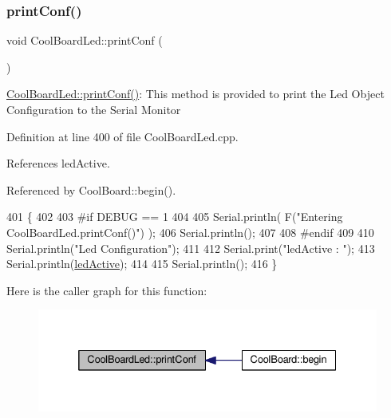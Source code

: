 \subsubsection{\texorpdfstring{print\+Conf()}{printConf()}}
{\footnotesize\ttfamily void Cool\+Board\+Led\+::print\+Conf (\begin{DoxyParamCaption}{ }\end{DoxyParamCaption})}

\hyperlink{classCoolBoardLed_a8ed3053a36f0ed4a131f43b5b17efb61}{Cool\+Board\+Led\+::print\+Conf()}\+: This method is provided to print the Led Object Configuration to the Serial Monitor 

Definition at line 400 of file Cool\+Board\+Led.\+cpp.



References led\+Active.



Referenced by Cool\+Board\+::begin().


\begin{DoxyCode}
401 \{
402 
403 \textcolor{preprocessor}{#if DEBUG == 1 }
404 
405     Serial.println( F(\textcolor{stringliteral}{"Entering CoolBoardLed.printConf()"}) );
406     Serial.println();
407 
408 \textcolor{preprocessor}{#endif}
409 
410     Serial.println(\textcolor{stringliteral}{"Led Configuration"});
411 
412     Serial.print(\textcolor{stringliteral}{"ledActive : "});
413     Serial.println(\hyperlink{classCoolBoardLed_a5f17c135516fcf4b44ea8a096ba0177a}{ledActive});
414 
415     Serial.println();   
416 \}
\end{DoxyCode}
Here is the caller graph for this function\+:
\nopagebreak
\begin{figure}[H]
\begin{center}
\leavevmode
\includegraphics[width=332pt]{classCoolBoardLed_a8ed3053a36f0ed4a131f43b5b17efb61_icgraph}
\end{center}
\end{figure}
\mbox{\label{classCoolBoardLed_ad5f0de4c628cbfbf49896042831c64ad}} 
